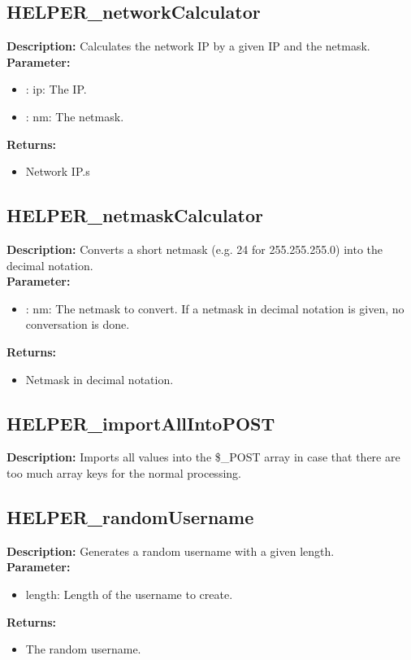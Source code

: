 \subsection{HELPER\_networkCalculator}
\textbf{Description:} Calculates the network IP by a given IP and the netmask.\\
\textbf{Parameter:}
\begin{itemize}
\item : ip: The IP.
\item : nm: The netmask.
\end{itemize}
\textbf{Returns:}
\begin{itemize}
\item Network IP.s
\end{itemize}

\subsection{HELPER\_netmaskCalculator}
\textbf{Description:} Converts a short netmask (e.g. 24 for 255.255.255.0) into the decimal notation.\\
\textbf{Parameter:}
\begin{itemize}
\item : nm: The netmask to convert. If a netmask in decimal notation is given, no conversation is done.
\end{itemize}
\textbf{Returns:}
\begin{itemize}
\item Netmask in decimal notation.
\end{itemize}

\subsection{HELPER\_importAllIntoPOST}
\textbf{Description:} Imports all values into the \$\_POST array in case that there are too much array keys for the normal processing.\\

\subsection{HELPER\_randomUsername}
\textbf{Description:} Generates a random username with a given length.\\
\textbf{Parameter:}
\begin{itemize}
\item length: Length of the username to create.
\end{itemize}
\textbf{Returns:}
\begin{itemize}
\item The random username.
\end{itemize}

